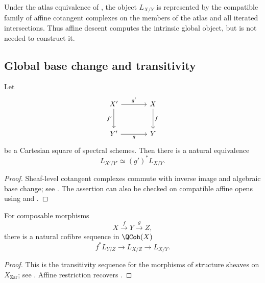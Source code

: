 \begin{remark}
\label{rem:global-cotangent-atlas-computation}
Under the atlas equivalence of , the
object $L_{X/Y}$ is represented by the compatible family of affine
cotangent complexes on the members of the atlas and all iterated
intersections. Thus affine descent computes the intrinsic global object,
but is not needed to construct it.
\end{remark}

\subsection{Global base change and transitivity}

\begin{theorem}
\label{thm:global-cotangent-base-change}
Let
\[
\begin{tikzcd}[column sep=large, row sep=large]
    X'
        \arrow[r, "g'"]
        \arrow[d, "f'"']
    &
    X
        \arrow[d, "f"]
    \\
    Y'
        \arrow[r, "g"']
    &
    Y
\end{tikzcd}
\]
be a Cartesian square of spectral schemes. Then there is a natural
equivalence
\[
    L_{X'/Y'}
    \simeq
    (g')^*L_{X/Y}.
\]
\end{theorem}

\begin{proof}
Sheaf-level cotangent complexes commute with inverse image and algebraic
base change; see \cite[Section~17.1.1]{LurieSAG}. The assertion can also
be checked on compatible affine opens using
 and
.
\end{proof}

\begin{theorem}
\label{thm:global-cotangent-transitivity}
For composable morphisms
\[
    X
    \xrightarrow{f}
    Y
    \xrightarrow{g}
    Z,
\]
there is a natural cofibre sequence in $\QCoh(X)$
\[
    f^*L_{Y/Z}
    \longrightarrow
    L_{X/Z}
    \longrightarrow
    L_{X/Y}.
\]
\end{theorem}

\begin{proof}
This is the transitivity sequence for the morphisms of structure sheaves
on $X_{\mathrm{Zar}}$; see \cite[Section~17.1.1]{LurieSAG}. Affine
restriction recovers .
\end{proof}

